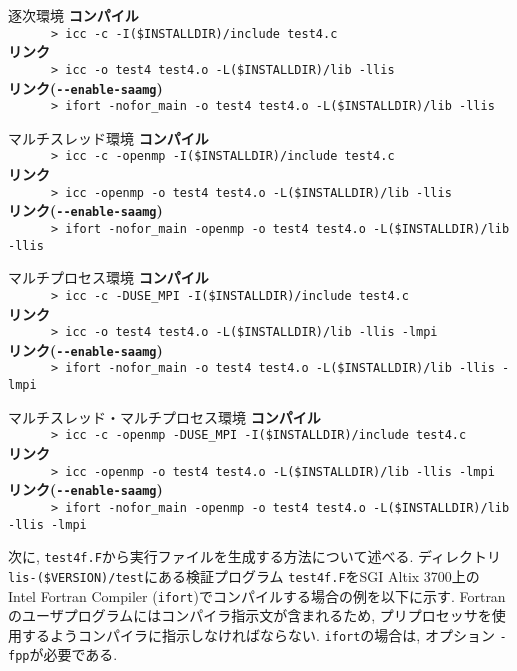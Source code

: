 \documentclass[a4paper]{jarticle}
\begin{document}
{{\begin{itembox}[l]{逐次環境}
\small
{\bf コンパイル}\\
\verb+      > icc -c -I($INSTALLDIR)/include test4.c+\\
{\bf リンク}\\
\verb+      > icc -o test4 test4.o -L($INSTALLDIR)/lib -llis+\\
{\bf リンク(\verb|--enable-saamg|)}\\
\verb+      > ifort -nofor_main -o test4 test4.o -L($INSTALLDIR)/lib -llis+
\end{itembox}
\begin{itembox}[l]{マルチスレッド環境}
\small
{\bf コンパイル}\\
\verb+      > icc -c -openmp -I($INSTALLDIR)/include test4.c+\\
{\bf リンク}\\
\verb+      > icc -openmp -o test4 test4.o -L($INSTALLDIR)/lib -llis+\\
{\bf リンク(\verb|--enable-saamg|)}\\
\verb+      > ifort -nofor_main -openmp -o test4 test4.o -L($INSTALLDIR)/lib -llis+
\end{itembox}
\begin{itembox}[l]{マルチプロセス環境}
\small
{\bf コンパイル}\\
\verb+      > icc -c -DUSE_MPI -I($INSTALLDIR)/include test4.c+\\
{\bf リンク}\\
\verb+      > icc -o test4 test4.o -L($INSTALLDIR)/lib -llis -lmpi+\\
{\bf リンク(\verb|--enable-saamg|)}\\
\verb+      > ifort -nofor_main -o test4 test4.o -L($INSTALLDIR)/lib -llis -lmpi+
\end{itembox}
\begin{itembox}[l]{マルチスレッド・マルチプロセス環境}
\small
{\bf コンパイル}\\
\verb+      > icc -c -openmp -DUSE_MPI -I($INSTALLDIR)/include test4.c+\\
{\bf リンク}\\
\verb+      > icc -openmp -o test4 test4.o -L($INSTALLDIR)/lib -llis -lmpi+\\
{\bf リンク(\verb|--enable-saamg|)}\\
\verb+      > ifort -nofor_main -openmp -o test4 test4.o -L($INSTALLDIR)/lib -llis -lmpi+
\end{itembox}

次に, \verb|test4f.F|から実行ファイルを生成する方法について述べる. 
ディレクトリ\verb|lis-($VERSION)/test|にある検証プログラム
\verb|test4f.F|をSGI Altix 3700上の
Intel Fortran Compiler (\verb|ifort|)でコンパイルする場合の例を以下に示す. 
Fortranのユーザプログラムにはコンパイラ指示文が含まれるため, 
プリプロセッサを使用するようコンパイラに指示しなければならない. 
\verb|ifort|の場合は, オプション {\tt -fpp}が必要である. 

}}
\end{document}
